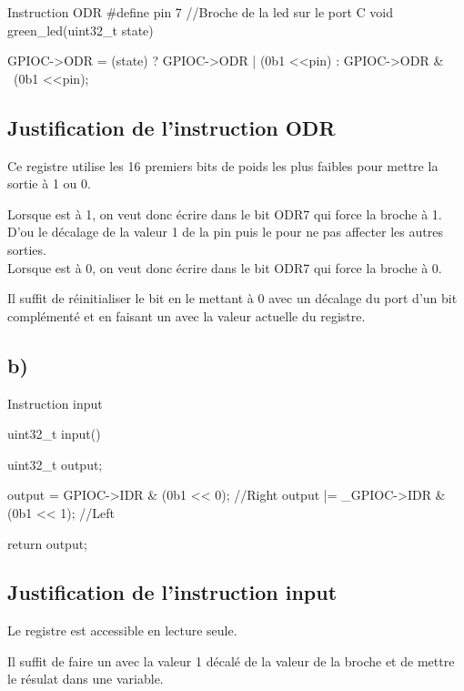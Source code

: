 {\begin{Cpp}{Instruction ODR}
  #define pin 7 //Broche de la led sur le port C
  void green_led(uint32_t state) {

    GPIOC->ODR = (state) ? GPIOC->ODR | (0b1 <<pin) : GPIOC->ODR & ~(0b1 <<pin);
     
  }
  

\end{Cpp}

\subsection{Justification de l'instruction ODR}

Ce registre utilise les 16 premiers bits de poids les plus faibles pour mettre la sortie à 1 ou 0.

Lorsque  est à 1, on veut donc écrire dans le bit ODR7 qui force la broche à 1. D'ou le décalage de la valeur 1 de la pin puis le  pour ne pas affecter les autres sorties. \\


Lorsque  est à 0, on veut donc écrire dans le bit ODR7 qui force la broche à 0. 

Il suffit de réinitialiser le bit en le mettant à 0 avec un décalage du port d'un bit complémenté et en faisant un 
avec la valeur actuelle du registre.

\subsection{b)}

\begin{Cpp}{Instruction input}

uint32_t input() {

    uint32_t output;

    output = GPIOC->IDR & (0b1 << 0);  //Right
    output |= _GPIOC->IDR & (0b1 << 1); //Left
    
    return output;
}

\end{Cpp}

\subsection{Justification de l'instruction input}

Le registre  est accessible en lecture seule.

Il suffit de faire un  avec la valeur 1 décalé de la valeur de la broche et de mettre le résulat dans une variable.

}
